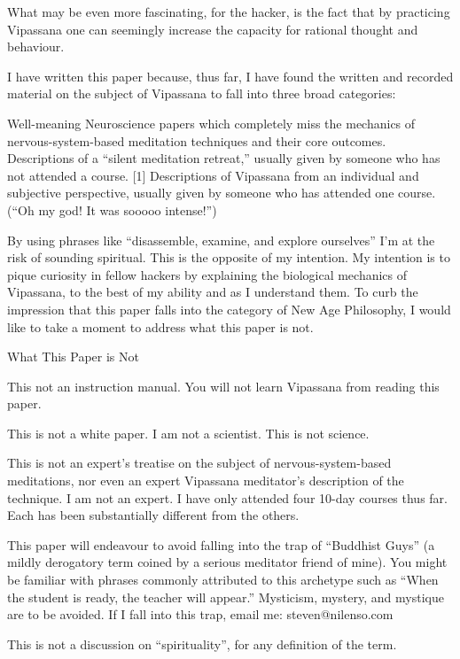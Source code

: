 \documentclass{article}
\begin{document}
What may be even more fascinating, for the hacker, is the fact that by practicing Vipassana one can seemingly increase the capacity for rational thought and behaviour.

I have written this paper because, thus far, I have found the written and recorded material on the subject of Vipassana to fall into three broad categories:

Well-meaning Neuroscience papers which completely miss the mechanics of nervous-system-based meditation techniques and their core outcomes.
Descriptions of a ``silent meditation retreat,'' usually given by someone who has not attended a course. [1]
Descriptions of Vipassana from an individual and subjective perspective, usually given by someone who has attended one course. (``Oh my god! It was sooooo intense!'')

By using phrases like ``disassemble, examine, and explore ourselves'' I'm at the risk of sounding spiritual. This is the opposite of my intention. My intention is to pique curiosity in fellow hackers by explaining the biological mechanics of Vipassana, to the best of my ability and as I understand them. To curb the impression that this paper falls into the category of New Age Philosophy, I would like to take a moment to address what this paper is not.

\pagebreak

\begin{center}
  \Huge{What This Paper is Not}
\end{center}


This not an instruction manual. You will not learn Vipassana from reading this paper.

This is not a white paper. I am not a scientist. This is not science.

This is not an expert's treatise on the subject of nervous-system-based meditations, nor even an expert Vipassana meditator's description of the technique. I am not an expert. I have only attended four 10-day courses thus far. Each has been substantially different from the others.

This paper will endeavour to avoid falling into the trap of ``Buddhist Guys'' (a mildly derogatory term coined by a serious meditator friend of mine). You might be familiar with phrases commonly attributed to this archetype such as ``When the student is ready, the teacher will appear.'' Mysticism, mystery, and mystique are to be avoided. If I fall into this trap, email me: steven@nilenso.com

This is not a discussion on ``spirituality'', for any definition of the term.
\end{document}
